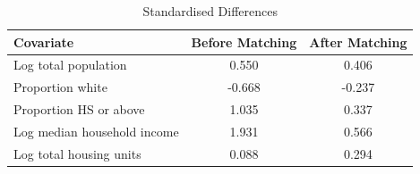 \begin{table}[htbp]
\centering                                                                                                                                                    
\caption{Covariate Balance}
\label{tab:balance}

\begin{subtable}{\textwidth}
\centering                                                                                                                                                    
\caption{Standardised Differences}
\begin{tabular}{lcc}                                                                                                                                      
\hline\hline  
\textbf{Covariate} & \textbf{Before Matching} & \textbf{After Matching} \\
\hline                                                                                                                                                        
    Log total population                &   0.550 &   0.406 \\
    Proportion white                    &  -0.668 &  -0.237 \\
    Proportion HS or above              &   1.035 &   0.337 \\
    Log median household income         &   1.931 &   0.566 \\
    Log total housing units             &   0.088 &   0.294 \\
\hline\hline                                                                                                                                                 
\end{tabular}
\end{subtable}

\vspace{1em}


\end{table}
